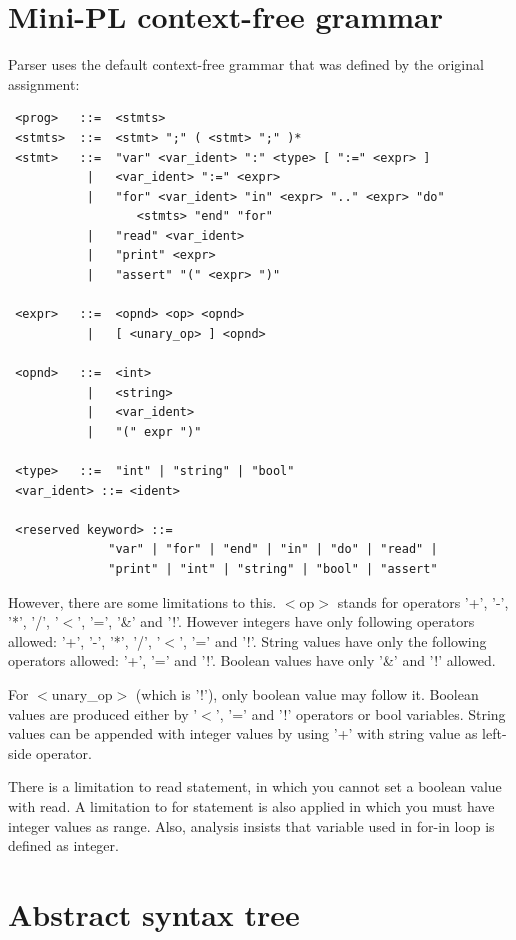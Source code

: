 \documentclass[english,11pt,twoside,a4paper]{article}
\begin{document}
\section{Mini-PL context-free grammar}

Parser uses the default context-free grammar that was defined by the original assignment:

\begin{lstlisting}
 <prog>   ::=  <stmts>
 <stmts>  ::=  <stmt> ";" ( <stmt> ";" )*
 <stmt>   ::=  "var" <var_ident> ":" <type> [ ":=" <expr> ] 
           |   <var_ident> ":=" <expr>  
           |   "for" <var_ident> "in" <expr> ".." <expr> "do" 
                  <stmts> "end" "for"  
           |   "read" <var_ident>  
           |   "print" <expr>  
           |   "assert" "(" <expr> ")"

 <expr>   ::=  <opnd> <op> <opnd>
           |   [ <unary_op> ] <opnd>
		   
 <opnd>   ::=  <int>
           |   <string>
           |   <var_ident>
           |   "(" expr ")"
              
 <type>   ::=  "int" | "string" | "bool"
 <var_ident> ::= <ident>
 
 <reserved keyword> ::= 
              "var" | "for" | "end" | "in" | "do" | "read" | 
              "print" | "int" | "string" | "bool" | "assert"
\end{lstlisting}

However, there are some limitations to this. $<$op$>$ stands for operators '+', '-', '*', '/', '$<$', '=', '\&' and '!'. However integers have only following operators allowed: '+', '-', '*', '/', '$<$', '=' and '!'. String values have only the following operators allowed: '+', '=' and '!'. Boolean values have only '\&' and '!' allowed.

For $<$unary\_op$>$ (which is '!'), only boolean value may follow it. Boolean values are produced either by '$<$', '=' and '!' operators or bool variables. String values can be appended with integer values by using '+' with string value as left-side operator.

There is a limitation to read statement, in which you cannot set a boolean value with read. A limitation to for statement is also applied in which you must have integer values as range. Also, analysis insists that variable used in for-in loop is defined as integer.

\section{Abstract syntax tree}
\end{document}
